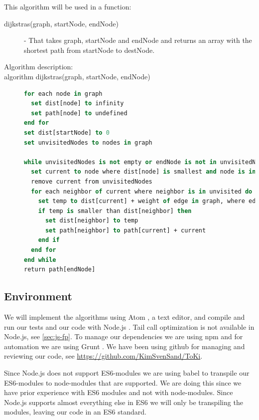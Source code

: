 \documentclass {article}
\begin{document}
This algorithm will be used in a function:
\begin{description}
\item[dijkstras(graph, startNode, endNode)] - That takes graph, startNode and endNode and returns an array with the shortest path from startNode to destNode. 

\item [Algorithm description:]
\item[algorithm dijkstras(graph, startNode, endNode)]
\item[]
\begin{lstlisting}[language=Pascal]
for each node in graph
  set dist[node] to infinity
  set path[node] to undefined
end for
set dist[startNode] to 0
set unvisitedNodes to nodes in graph

while unvisitedNodes is not empty or endNode is not in unvisitedNodes do
  set current to node where dist[node] is smallest and node is in unvisitedNodes 
  remove current from unvisitedNodes
  for each neighbor of current where neighbor is in unvisited do
    set temp to dist[current] + weight of edge in graph, where edge is from current to neighbor
    if temp is smaller than dist[neighbor] then
      set dist[neighbor] to temp
      set path[neighbor] to path[current] + current
    end if
  end for
end while
return path[endNode]
\end{lstlisting}
\end{description}
\subsection{Environment}
We will implement the algorithms using Atom \cite{atom}, a text editor, and compile and run our tests and our code with Node.js \cite{nodejs}. Tail call optimization is not available in Node.js, see \ref{sec:js-fp}. To manage our dependencies we are using npm \cite{npm}and for automation we are using Grunt \cite{grunt}. We have been using github for managing and reviewing our code, see \url{https://github.com/KimSvenSand/ToKi}.

Since Node.js does not support ES6-modules we are using babel \cite{babel} to transpile our ES6-modules to node-modules that are supported. We are doing this since we have prior experience with ES6 modules and not with node-modules. Since Node.js supports almost everything else in ES6 we will only be transpiling the modules, leaving our code in an ES6 standard.
\end{document}

